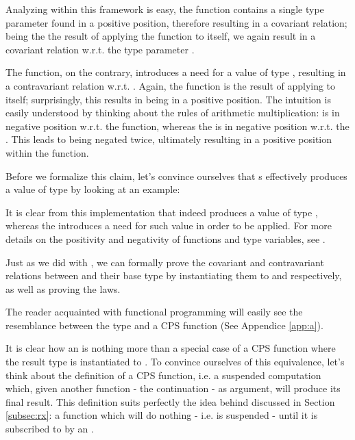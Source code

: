 Analyzing  within this framework is easy, the  function contains a single type parameter found in a positive position, therefore resulting in a covariant relation; being the  the result of applying the  function to itself, we again result in a covariant relation w.r.t. the type parameter .

The  function, on the contrary, introduces a need for a value of type , resulting in a contravariant relation w.r.t. . Again, the  function is the result of applying  to itself; surprisingly, this results in  being in a positive position. The intuition is easily understood by thinking about the rules of arithmetic multiplication:  is in negative position w.r.t. the  function, whereas the  is in negative position w.r.t. the . This leads to  being negated twice, ultimately resulting in a positive position within the  function. 


Before we formalize this claim, let's convince ourselves that s effectively produces a value of type  by looking at an example:


It is clear from this implementation that  indeed produces a value of type , whereas the  introduces a need for such value in order to be applied. For more details on the positivity and negativity of functions and type variables, see \cite{pos-neg}\cite{pos-neg2}.

Just as we did with , we can formally prove the covariant and contravariant relations between  and their base type  by instantiating them to  and  respectively, as well as proving the laws.


The reader acquainted with functional programming will easily see the resemblance between the  type and a CPS function (See Appendice \ref{app:a}).


It is clear how an  is nothing more than a special case of a CPS function where the result type  is instantiated to . To convince ourselves of this equivalence, let's think about the definition of a CPS function, i.e. a suspended computation which, given another function - the continuation - as argument, will produce its final result. This definition suits perfectly the idea behind  discussed in Section \ref{subsec:rx}: a function which will do nothing - i.e. is suspended - until it is subscribed to by an .

